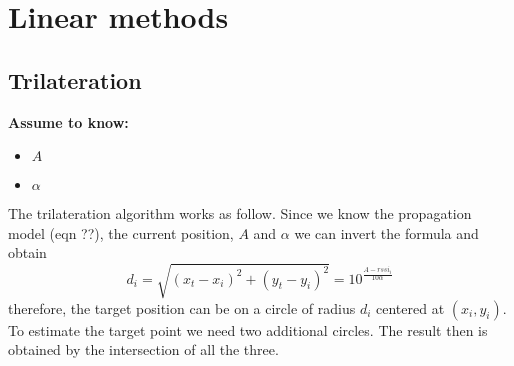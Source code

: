 \documentclass[12pt]{report}
\begin{document}
\section{Linear methods}
\subsection{Trilateration}

  \begin{center}
  \textbf{Assume to know:}
  \begin{itemize}
    \centering
    \item $A$
    \item $\alpha$
  \end{itemize}
  \end{center}
The trilateration algorithm works as follow. Since we know the propagation model (eqn ??), the current position, $A$ and $\alpha$ we can invert the formula and obtain
\begin{equation}
    d_i=\sqrt{(x_t-x_i)^2+(y_t-y_i)^2}=10^{\frac{A-rssi_i}{10\alpha}}    
\end{equation}
therefore, the target position can be on a circle of radius $d_i$ centered at $(x_i,y_i)$. 
To estimate the target point we need two additional circles. The result then is obtained by the intersection of all the three.
\begin{center}
\end{center}
\end{document}
